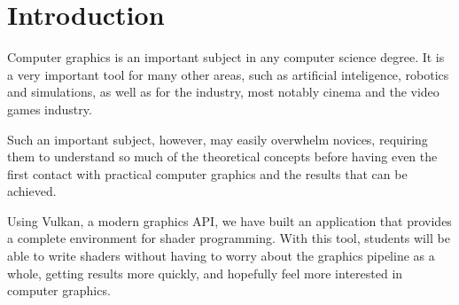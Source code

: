 \section{Introduction}
Computer graphics is an important subject in any computer science degree. It is a very important tool for many other areas, such as artificial inteligence, robotics and simulations, as well as for the industry, most notably cinema and the video games industry.

Such an important subject, however, may easily overwhelm novices, requiring them to understand so much of the theoretical concepts before having even the first contact with practical computer graphics and the results that can be achieved.

Using Vulkan, a modern graphics API, we have built an application that provides a complete environment for shader programming. With this tool, students will be able to write shaders without having to worry about the graphics pipeline as a whole, getting results more quickly, and hopefully feel more interested in computer graphics.


